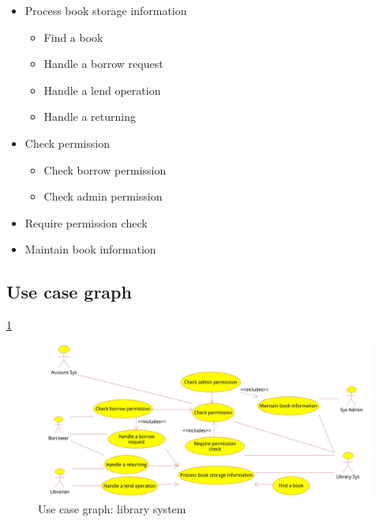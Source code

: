\documentclass{article}
\begin{document}
    \begin{itemize}
        \item Process book storage information
        \begin{itemize}
            \item Find a book
            \item Handle a borrow request
            \item Handle a lend operation
            \item Handle a returning
        \end{itemize}
        \item Check permission
        \begin{itemize}
            \item Check borrow permission
            \item Check admin permission
        \end{itemize}
        \item Require permission check
        \item Maintain book information 
    \end{itemize}

    \subsection{Use case graph}
    \ref{figure:ucg}

    \begin{figure}[h]
        \centering
        \caption{Use case graph: library system}
        \label{figure:ucg}
        \includegraphics[scale=0.27]{pics/Library Use Case.jpg}
    \end{figure}
\end{document}
